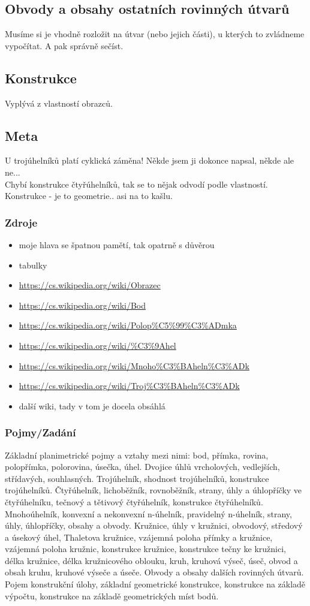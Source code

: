 \documentclass[12pt]{article}
\begin{document}
\subsection{Obvody a obsahy ostatních rovinných útvarů}
Musíme si je vhodně rozložit na útvar (nebo jejich  části), u kterých to zvládneme vypočítat. A pak správně sečíst.
\subsection{Konstrukce}
 Vyplývá z vlastností obrazců.

\subsection{Meta}
U trojúhelníků platí cyklická záměna! Někde jsem ji dokonce napsal, někde ale ne...\\
Chybí konstrukce čtyřúhelníků, tak se to nějak odvodí podle vlastností.\\
Konstrukce - je to geometrie.. asi na to kašlu.
\subsubsection{Zdroje}
\begin{itemize}
\item moje hlava se špatnou pamětí, tak opatrně s důvěrou
\item tabulky
\item \url{https://cs.wikipedia.org/wiki/Obrazec}
\item \url{https://cs.wikipedia.org/wiki/Bod}
\item \url{https://cs.wikipedia.org/wiki/Polop\%C5\%99\%C3\%ADmka}
\item \url{https://cs.wikipedia.org/wiki/\%C3\%9Ahel}
\item \url{https://cs.wikipedia.org/wiki/Mnoho\%C3\%BAheln\%C3\%ADk}
\item \url{https://cs.wikipedia.org/wiki/Troj\%C3\%BAheln\%C3\%ADk}
\item další wiki, tady v tom je docela obsáhlá
\end{itemize}
\subsubsection{Pojmy/Zadání}
Základní planimetrické pojmy a vztahy mezi nimi: bod, přímka, rovina, polopřímka, polorovina, úsečka, úhel. Dvojice úhlů vrcholových, vedlejších, střídavých, souhlasných. Trojúhelník, shodnost trojúhelníků, konstrukce trojúhelníků. Čtyřúhelník, lichoběžník, rovnoběžník, strany, úhly a úhlopříčky ve čtyřúhelníku, tečnový a tětivový čtyřúhelník, konstrukce čtyřúhelníků. Mnohoúhelník, konvexní a nekonvexní n-úhelník, pravidelný n-úhelník, strany, úhly, úhlopříčky, obsahy a obvody. Kružnice, úhly v kružnici, obvodový, středový a úsekový úhel, Thaletova kružnice, vzájemná poloha přímky a kružnice, vzájemná poloha kružnic, konstrukce kružnice, konstrukce tečny ke kružnici, délka kružnice, délka kružnicového oblouku, kruh, kruhová výseč, úseč, obvod a obsah kruhu, kruhové výseče a úseče. Obvody a obsahy dalších rovinných útvarů. Pojem konstrukční úlohy, základní geometrické konstrukce, konstrukce na základě výpočtu, konstrukce na základě geometrických míst bodů.
\end{document}
